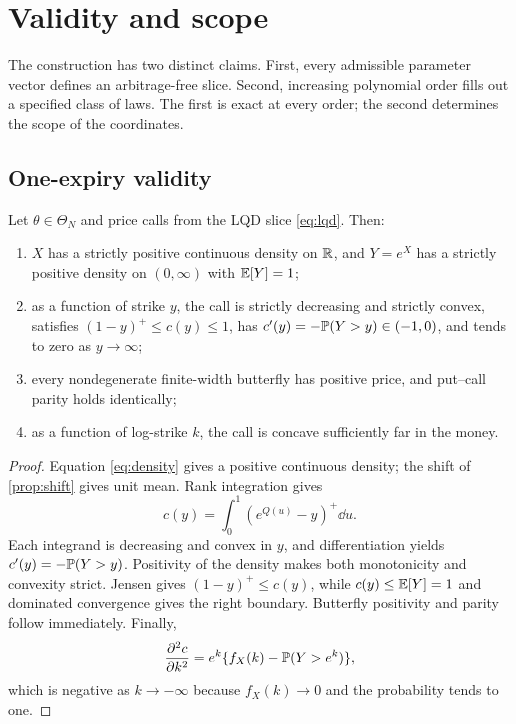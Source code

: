\section{Validity and scope}
\label{sec:validity}

The construction has two distinct claims.  First, every admissible parameter
vector defines an arbitrage-free slice.  Second, increasing polynomial order
fills out a specified class of laws.  The first is exact at every order; the
second determines the scope of the coordinates.

\subsection{One-expiry validity}

\begin{proposition}
\label{prop:noarb}
Let $\theta\in\Theta_N$ and price calls from the LQD slice
\eqref{eq:lqd}.  Then:
\begin{enumerate}[label=(\roman*)]
\item $X$ has a strictly positive continuous density on $\mathbb{R}$, and
$Y=e^X$ has a strictly positive density on $(0,\infty)$ with $\mathbb{E}[Y]=1$;
\item as a function of strike $y$, the call is strictly decreasing and
strictly convex, satisfies $(1-y)^+\le c(y)\le1$, has
$c'(y)=-\mathbb{P}(Y>y)\in(-1,0)$, and tends to zero as $y\to\infty$;
\item every nondegenerate finite-width butterfly has positive price, and
put--call parity holds identically;
\item as a function of log-strike $k$, the call is concave sufficiently far
in the money.
\end{enumerate}
\end{proposition}

\begin{proof}
Equation \eqref{eq:density} gives a positive continuous density; the shift of
\cref{prop:shift} gives unit mean.  Rank integration gives
\[
c(y)=\int_0^1(e^{Q(u)}-y)^+\dd u.
\]
Each integrand is decreasing and convex in $y$, and differentiation yields
$c'(y)=-\mathbb{P}(Y>y)$.  Positivity of the density makes both monotonicity and
convexity strict.  Jensen gives $(1-y)^+\le c(y)$, while
$c(y)\le\mathbb{E}[Y]=1$ and dominated convergence gives the right boundary.
Butterfly positivity and parity follow immediately.  Finally,
\[
\frac{\partial^2c}{\partial k^2}
=e^k\{f_X(k)-\mathbb{P}(Y>e^k)\},
\]
which is negative as $k\to-\infty$ because $f_X(k)\to0$ and the probability
tends to one.
\end{proof}

